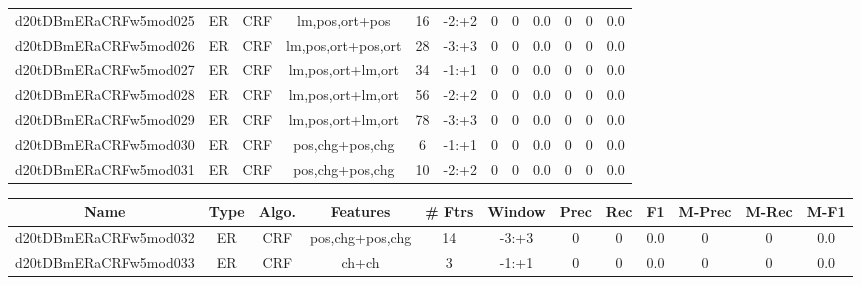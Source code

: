 \documentclass[a4paper]{article}
\begin{document}
\begin{landscape}
\begin{center}
\begin{tabular}{ |c|c|c|c|c|c|c|c|c|c|c|c|}
 
 	
 	\small{ d20tDBmERaCRFw5mod025 } & ER & CRF & lm,pos,ort+pos  &  16 &  -2:+2  &  0 & 0 & 0.0  &  0 & 0 & 0.0 \\
 	

 
 	
 	\small{ d20tDBmERaCRFw5mod026 } & ER & CRF & lm,pos,ort+pos,ort  &  28 &  -3:+3  &  0 & 0 & 0.0  &  0 & 0 & 0.0 \\
 	

 
 	
 	\small{ d20tDBmERaCRFw5mod027 } & ER & CRF & lm,pos,ort+lm,ort  &  34 &  -1:+1  &  0 & 0 & 0.0  &  0 & 0 & 0.0 \\
 	

 
 	
 	\small{ d20tDBmERaCRFw5mod028 } & ER & CRF & lm,pos,ort+lm,ort  &  56 &  -2:+2  &  0 & 0 & 0.0  &  0 & 0 & 0.0 \\
 	

 
 	
 	\small{ d20tDBmERaCRFw5mod029 } & ER & CRF & lm,pos,ort+lm,ort  &  78 &  -3:+3  &  0 & 0 & 0.0  &  0 & 0 & 0.0 \\
 	

 
 	
 	\small{ d20tDBmERaCRFw5mod030 } & ER & CRF & pos,chg+pos,chg  &  6 &  -1:+1  &  0 & 0 & 0.0  &  0 & 0 & 0.0 \\
 	

 
 	
 	\small{ d20tDBmERaCRFw5mod031 } & ER & CRF & pos,chg+pos,chg  &  10 &  -2:+2  &  0 & 0 & 0.0  &  0 & 0 & 0.0 \\
 	
 \hline
\end{tabular}
\end{center}




\begin{center}
\begin{tabular}{ |c|c|c|c|c|c|c|c|c|c|c|c|} 
 \hline
 	Name & Type & Algo. & Features & \# Ftrs & Window & Prec & Rec & F1 & M-Prec & M-Rec & M-F1\\
 \hline

 	

 
 	
 	\small{ d20tDBmERaCRFw5mod032 } & ER & CRF & pos,chg+pos,chg  &  14 &  -3:+3  &  0 & 0 & 0.0  &  0 & 0 & 0.0 \\
 	

 
 	
 	\small{ d20tDBmERaCRFw5mod033 } & ER & CRF & ch+ch  &  3 &  -1:+1  &  0 & 0 & 0.0  &  0 & 0 & 0.0 \\
 	


\end{tabular}
\end{center}
\end{landscape}
\end{document}
